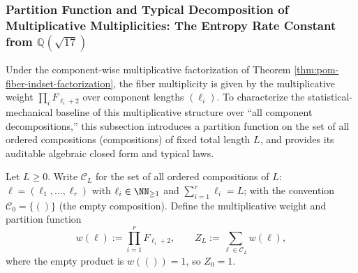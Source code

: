 \subsubsection{Partition Function and Typical Decomposition of Multiplicative Multiplicities: The Entropy Rate Constant from \texorpdfstring{$\mathbb{Q}(\sqrt{17})$}{Q(sqrt(17))}}\label{subsec:pom-multiplicity-composition-partition-sqrt17}
Under the component-wise multiplicative factorization of Theorem \ref{thm:pom-fiber-indset-factorization}, the fiber multiplicity is given by the multiplicative weight
\(
\prod_i F_{\ell_i+2}
\)
over component lengths \((\ell_i)\).
To characterize the statistical-mechanical baseline of this multiplicative structure over ``all component decompositions,'' this subsection introduces a partition function on the set of all ordered compositions (compositions) of fixed total length \(L\), and provides its auditable algebraic closed form and typical laws.

\begin{definition}\label{def:pom-multiplicity-composition-partition}
Let \(L\ge 0\).
Write \(\mathcal{C}_L\) for the set of all ordered compositions of \(L\): \(\boldsymbol{\ell}=(\ell_1,\dots,\ell_r)\) with
\(\ell_i\in\NN_{\ge 1}\) and \(\sum_{i=1}^r \ell_i=L\); with the convention \(\mathcal{C}_0=\{()\}\) (the empty composition).
Define the multiplicative weight and partition function
\[
w(\boldsymbol{\ell})
:=\prod_{i=1}^r F_{\ell_i+2},
\qquad
Z_L:=\sum_{\boldsymbol{\ell}\in\mathcal{C}_L} w(\boldsymbol{\ell}),
\]
where the empty product is \(w(())=1\), so \(Z_0=1\).
\end{definition}

